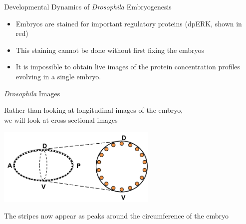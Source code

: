 \documentclass[10pt]{beamer}
\begin{document}
\begin{frame}{Developmental Dynamics of {\em Drosophila} Embryogenesis}
\begin{center}
\end{center}

\begin{itemize}
\item Embryos are stained for important regulatory proteins (dpERK, shown in red) 

\item This staining cannot be done without first fixing the embryos
\item It is impossible to obtain live images of the protein concentration profiles evolving in a single embryo.
\end{itemize}

\end{frame}

\begin{frame}{{\em Drosophila} Images}

\begin{center}
Rather than looking at longitudinal images of the embryo, \\
we will look at cross-sectional images

\includegraphics[width=3in]{drosophila_schematic}


The stripes now appear as peaks around the circumference of the embryo

\end{center}

\end{frame}
\end{document}
